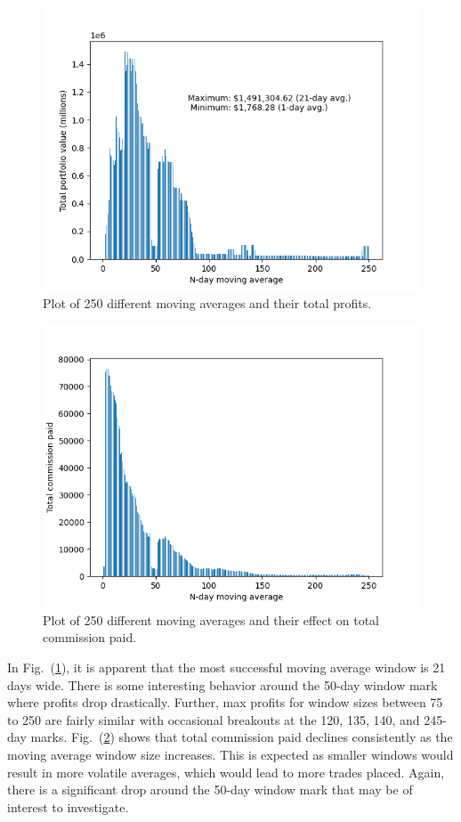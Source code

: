\documentclass{article}
\begin{document}
\begin{figure}[h]
        \includegraphics[totalheight=6cm]{mov_avgs.png}
        \centering
        \caption{Plot of 250 different moving averages and their total profits.}
        \label{mov_avgs}
\end{figure}

\begin{figure}[h]
    \includegraphics[totalheight=6cm]{commissions.png}
    \centering
    \caption{Plot of 250 different moving averages and their effect on total commission paid.}
    \label{commissions}
\end{figure}

In Fig.\ (\ref{mov_avgs}), it is apparent that the most successful moving average window is 21 days wide. There is some interesting behavior around the 50-day window mark where profits drop drastically. Further, max profits for window sizes between 75 to 250 are fairly similar with occasional breakouts at the 120, 135, 140, and 245-day marks.
Fig.\ (\ref{commissions}) shows that total commission paid declines consistently as the moving average window size increases. This is expected as smaller windows would result in more volatile averages, which would lead to more trades placed. Again, there is a significant drop around the 50-day window mark that may be of interest to investigate.
\end{document}
